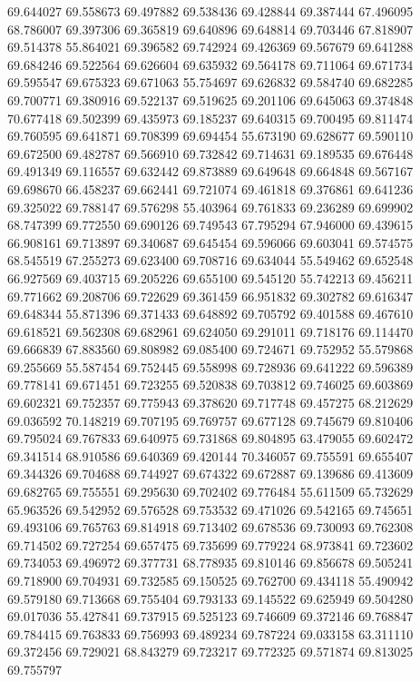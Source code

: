 69.644027
69.558673
69.497882
69.538436
69.428844
69.387444
67.496095
68.786007
69.397306
69.365819
69.640896
69.648814
69.703446
67.818907
69.514378
55.864021
69.396582
69.742924
69.426369
69.567679
69.641288
69.684246
69.522564
69.626604
69.635932
69.564178
69.711064
69.671734
69.595547
69.675323
69.671063
55.754697
69.626832
69.584740
69.682285
69.700771
69.380916
69.522137
69.519625
69.201106
69.645063
69.374848
70.677418
69.502399
69.435973
69.185237
69.640315
69.700495
69.811474
69.760595
69.641871
69.708399
69.694454
55.673190
69.628677
69.590110
69.672500
69.482787
69.566910
69.732842
69.714631
69.189535
69.676448
69.491349
69.116557
69.632442
69.873889
69.649648
69.664848
69.567167
69.698670
66.458237
69.662441
69.721074
69.461818
69.376861
69.641236
69.325022
69.788147
69.576298
55.403964
69.761833
69.236289
69.699902
68.747399
69.772550
69.690126
69.749543
67.795294
67.946000
69.439615
66.908161
69.713897
69.340687
69.645454
69.596066
69.603041
69.574575
68.545519
67.255273
69.623400
69.708716
69.634044
55.549462
69.652548
66.927569
69.403715
69.205226
69.655100
69.545120
55.742213
69.456211
69.771662
69.208706
69.722629
69.361459
66.951832
69.302782
69.616347
69.648344
55.871396
69.371433
69.648892
69.705792
69.401588
69.467610
69.618521
69.562308
69.682961
69.624050
69.291011
69.718176
69.114470
69.666839
67.883560
69.808982
69.085400
69.724671
69.752952
55.579868
69.255669
55.587454
69.752445
69.558998
69.728936
69.641222
69.596389
69.778141
69.671451
69.723255
69.520838
69.703812
69.746025
69.603869
69.602321
69.752357
69.775943
69.378620
69.717748
69.457275
68.212629
69.036592
70.148219
69.707195
69.769757
69.677128
69.745679
69.810406
69.795024
69.767833
69.640975
69.731868
69.804895
63.479055
69.602472
69.341514
68.910586
69.640369
69.420144
70.346057
69.755591
69.655407
69.344326
69.704688
69.744927
69.674322
69.672887
69.139686
69.413609
69.682765
69.755551
69.295630
69.702402
69.776484
55.611509
65.732629
65.963526
69.542952
69.576528
69.753532
69.471026
69.542165
69.745651
69.493106
69.765763
69.814918
69.713402
69.678536
69.730093
69.762308
69.714502
69.727254
69.657475
69.735699
69.779224
68.973841
69.723602
69.734053
69.496972
69.377731
68.778935
69.810146
69.856678
69.505241
69.718900
69.704931
69.732585
69.150525
69.762700
69.434118
55.490942
69.579180
69.713668
69.755404
69.793133
69.145522
69.625949
69.504280
69.017036
55.427841
69.737915
69.525123
69.746609
69.372146
69.768847
69.784415
69.763833
69.756993
69.489234
69.787224
69.033158
63.311110
69.372456
69.729021
68.843279
69.723217
69.772325
69.571874
69.813025
69.755797
